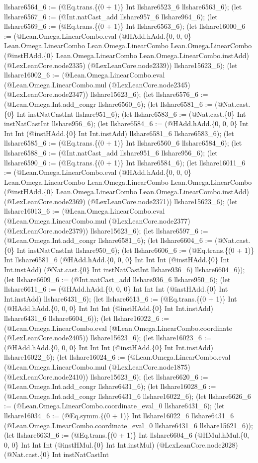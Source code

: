 \documentclass[11pt]{article}
\begin{document}
llshare6564\_6 := (@Eq.trans.\{(0 + 1)\} Int llshare6523\_6 llshare6563\_6); (let llshare6567\_6 := (@Int.natCast\_add llshare957\_6 llshare964\_6); (let llshare6569\_6 := (@Eq.trans.\{(0 + 1)\} Int llshare6563\_6); (let llshare16000\_6 := (@Lean.Omega.LinearCombo.eval (@HAdd.hAdd.\{0, 0, 0\} Lean.Omega.LinearCombo Lean.Omega.LinearCombo Lean.Omega.LinearCombo (@instHAdd.\{0\} Lean.Omega.LinearCombo Lean.Omega.LinearCombo.instAdd) (@LexLeanCore.node2335) (@LexLeanCore.node2339)) llshare15623\_6); (let llshare16002\_6 := (@Lean.Omega.LinearCombo.eval (@Lean.Omega.LinearCombo.mul (@LexLeanCore.node2345) (@LexLeanCore.node2347)) llshare15623\_6); (let llshare6576\_6 := (@Lean.Omega.Int.add\_congr llshare6560\_6); (let llshare6581\_6 := (@Nat.cast.\{0\} Int instNatCastInt llshare951\_6); (let llshare6583\_6 := (@Nat.cast.\{0\} Int instNatCastInt llshare956\_6); (let llshare6584\_6 := (@HAdd.hAdd.\{0, 0, 0\} Int Int Int (@instHAdd.\{0\} Int Int.instAdd) llshare6581\_6 llshare6583\_6); (let llshare6585\_6 := (@Eq.trans.\{(0 + 1)\} Int llshare6560\_6 llshare6584\_6); (let llshare6588\_6 := (@Int.natCast\_add llshare951\_6 llshare956\_6); (let llshare6590\_6 := (@Eq.trans.\{(0 + 1)\} Int llshare6584\_6); (let llshare16011\_6 := (@Lean.Omega.LinearCombo.eval (@HAdd.hAdd.\{0, 0, 0\} Lean.Omega.LinearCombo Lean.Omega.LinearCombo Lean.Omega.LinearCombo (@instHAdd.\{0\} Lean.Omega.LinearCombo Lean.Omega.LinearCombo.instAdd) (@LexLeanCore.node2369) (@LexLeanCore.node2371)) llshare15623\_6); (let llshare16013\_6 := (@Lean.Omega.LinearCombo.eval (@Lean.Omega.LinearCombo.mul (@LexLeanCore.node2377) (@LexLeanCore.node2379)) llshare15623\_6); (let llshare6597\_6 := (@Lean.Omega.Int.add\_congr llshare6581\_6); (let llshare6604\_6 := (@Nat.cast.\{0\} Int instNatCastInt llshare950\_6); (let llshare6606\_6 := (@Eq.trans.\{(0 + 1)\} Int llshare6581\_6 (@HAdd.hAdd.\{0, 0, 0\} Int Int Int (@instHAdd.\{0\} Int Int.instAdd) (@Nat.cast.\{0\} Int instNatCastInt llshare936\_6) llshare6604\_6)); (let llshare6609\_6 := (@Int.natCast\_add llshare936\_6 llshare950\_6); (let llshare6611\_6 := (@HAdd.hAdd.\{0, 0, 0\} Int Int Int (@instHAdd.\{0\} Int Int.instAdd) llshare6431\_6); (let llshare6613\_6 := (@Eq.trans.\{(0 + 1)\} Int (@HAdd.hAdd.\{0, 0, 0\} Int Int Int (@instHAdd.\{0\} Int Int.instAdd) llshare6431\_6 llshare6604\_6)); (let llshare16022\_6 := (@Lean.Omega.LinearCombo.eval (@Lean.Omega.LinearCombo.coordinate (@LexLeanCore.node2405)) llshare15623\_6); (let llshare16023\_6 := (@HAdd.hAdd.\{0, 0, 0\} Int Int Int (@instHAdd.\{0\} Int Int.instAdd) llshare16022\_6); (let llshare16024\_6 := (@Lean.Omega.LinearCombo.eval (@Lean.Omega.LinearCombo.mul (@LexLeanCore.node1875) (@LexLeanCore.node2410)) llshare15623\_6); (let llshare6620\_6 := (@Lean.Omega.Int.add\_congr llshare6431\_6); (let llshare16028\_6 := (@Lean.Omega.Int.add\_congr llshare6431\_6 llshare16022\_6); (let llshare6626\_6 := (@Lean.Omega.LinearCombo.coordinate\_eval\_0 llshare6431\_6); (let llshare16034\_6 := (@Eq.symm.\{(0 + 1)\} Int llshare16022\_6 llshare6431\_6 (@Lean.Omega.LinearCombo.coordinate\_eval\_0 llshare6431\_6 llshare15621\_6)); (let llshare6633\_6 := (@Eq.trans.\{(0 + 1)\} Int llshare6604\_6 (@HMul.hMul.\{0, 0, 0\} Int Int Int (@instHMul.\{0\} Int Int.instMul) (@LexLeanCore.node2028) (@Nat.cast.\{0\} Int instNatCastInt 
\end{document}
